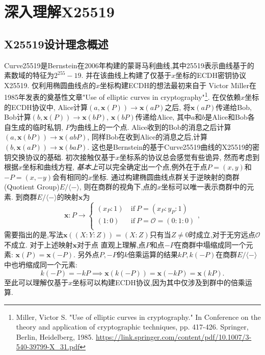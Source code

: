 \section{深入理解X25519}

\subsection{X25519设计理念概述}

Curve25519是Bernstein在2006年构建的蒙哥马利曲线,其中25519表示曲线基于的素数域的特征为$2^{255}-19$.
并在该曲线上构建了仅基于$x$坐标的ECDH密钥协议X25519.
仅利用椭圆曲线点的$x$坐标构建ECDH的想法最初来自于
Victor Miller在1985年发表的奠基性文章"Use of elliptic curves in cryptography"\footnote{
Miller, Victor S. "Use of elliptic curves in cryptography." In Conference on the theory and application of cryptographic techniques, pp. 417-426. Springer, Berlin, Heidelberg, 1985.
\url{https://link.springer.com/content/pdf/10.1007/3-540-39799-X_31.pdf}}.
在仅依赖$x$坐标的ECDH协议中, Alice计算$(a, \mathbf{x}(P))\rightarrow\mathbf{x}(aP)$之后,
将$\mathbf{x}(aP)$传递给Bob, Bob计算$(b, \mathbf{x}(P))\rightarrow \mathbf{x}(bP)$, 
$\mathbf{x}(bP)$传递给Alice, 其中$a$和$b$是Alice和Bob各自生成的临时私钥, $P$为曲线上的一个点.
Alice收到的Bob的消息之后计算$(a, \mathbf{x}(bP)) \rightarrow \mathbf{x}(abP)$,
同样Bob在收到Alice的消息之后,计算$(b, \mathbf{x}(aP))\rightarrow \mathbf{x}(baP)$.
这也是Bernstein的基于Curve25519曲线的X25519的密钥交换协议的基础.
初次接触仅基于$x$坐标系的协议总会感觉有些诡异, 然而考虑到根据$x$坐标和曲线方程,
\textit{基本上}可以完全确定出一个点,例外在于点$P=(x,y)$和$-P=(x,-y)$会有相同的$x$坐标.
通过构建椭圆曲线点群关于逆映射的商群(Quotient Group)$E/\langle - \rangle$,
则在商群的视角下,点的$x$坐标可以唯一表示商群中的元素.
到商群$E/\langle - \rangle$的映射$\mathbf{x}$为
\begin{equation}\label{eq-mapx}
\mathbf{x}: P \rightarrow 
\left\{
\begin{array}{ll}
(x_P : 1)  &\ \text{if}\ P = (x_P : y_P : 1) \\
(1 : 0)      &\ \text{if}\ P = \mathcal{O} = (0: 1: 0)\\ 
\end{array},
\right.
\end{equation}
需要指出的是,写法$\mathbf{x}((X:Y:Z)) = (X:Z)$只有当$Z\neq0$时成立,对于无穷远点$\mathcal{O}$不成立.
对于上述映射$\mathbf{x}$对于点
直观上理解,点$P$和点$-P$在商群中塌缩成同一个元素: $\mathbf{x}(P)=\mathbf{x}(-P)$.
另外点$P, -P$的$k$倍乘运算的结果$kP, k(-P)$在商群$E/\langle - \rangle$中也坍缩成同一个元素: 
$$k(-P) = -kP \implies \mathbf{x}(k(-P)) = \mathbf{x}(-kP)= \mathbf{x}(kP).$$
至此可以理解仅基于$x$坐标可以构建ECDH协议,因为其中仅涉及到群中的倍乘运算.

